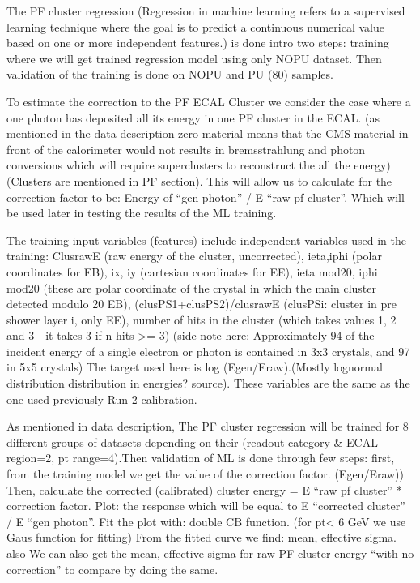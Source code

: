 The PF cluster regression (Regression in machine learning refers to a supervised learning technique where the goal is to predict a continuous numerical value based on one or more independent features.) %
is done intro two steps: training where we will get trained regression model using only NOPU dataset. Then validation of the training is done on NOPU and PU (80) samples.

To estimate the correction to the PF ECAL Cluster we consider the case where a one photon has deposited all its energy in one PF cluster in the ECAL.  (as mentioned in the data description zero material means that the CMS material in front of the calorimeter would not results in bremsstrahlung and photon conversions which will require superclusters to reconstruct the all the energy) (Clusters are mentioned in PF section). This will allow us to calculate for the correction factor to be: Energy of “gen photon” / E “raw pf cluster”. Which will be used later in testing the results of the ML training.

The training input variables (features) include independent variables used in the training:   
ClusrawE (raw energy of the cluster, uncorrected), 
ieta,iphi (polar coordinates for EB), 
ix, iy (cartesian coordinates for EE), 
ieta mod20, iphi mod20 (these are polar coordinate of the crystal in which the main cluster detected modulo 20 EB), 
(clusPS1+clusPS2)/clusrawE (clusPSi: cluster in pre shower layer i, only EE),   
number of hits in the cluster (which takes values 1, 2 and 3 - it takes 3 if n hits >= 3) (side note here: Approximately 94 of the incident energy of a single electron or photon is contained in 3x3 crystals, and 97 in 5x5 crystals) %
The target used here is log (Egen/Eraw).(Mostly lognormal distribution distribution in energies? source). These variables are the same as the one used previously Run 2 calibration. 

As mentioned in data description, The PF cluster regression will be trained for 8 different groups of datasets depending on their (readout category & ECAL region=2, pt range=4).Then validation of ML is done through few steps:  
first, from the training model we get the value of the correction factor. (Egen/Eraw)) 
Then, calculate the corrected (calibrated) cluster energy = E “raw pf cluster” * correction factor.  
Plot: the response which will be equal to E “corrected cluster” / E “gen photon”. 
Fit the plot with: double CB function. (for pt< 6 GeV we use Gaus function for fitting) 
From the fitted curve we find: mean, effective sigma. also We can also get the mean, effective sigma for raw PF cluster energy “with no correction” to compare by doing the same. 

